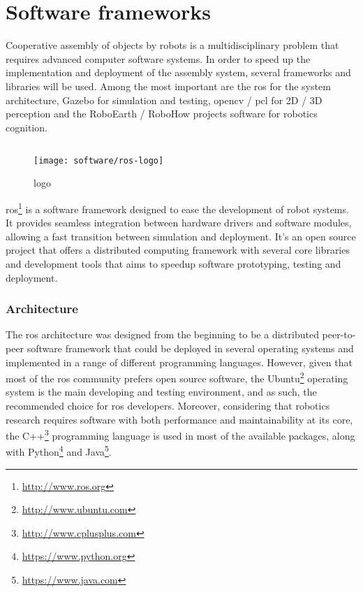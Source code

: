 \section{Software frameworks}

Cooperative assembly of objects by robots is a multidisciplinary problem that requires advanced computer software systems. In order to speed up the implementation and deployment of the assembly system, several frameworks and libraries will be used. Among the most important are the \gls{ros} for the system architecture, Gazebo for simulation and testing, \gls{opencv} / \gls{pcl} for 2D / 3D perception and the RoboEarth / RoboHow projects software for robotics cognition.

\subsection{}

\begin{wrapfigure}{r}{0.23\textwidth}
	\centering
	\vspace*{-2em}
	\texttt{[image: software/ros-logo]}
	\caption{ logo}
	\label{fig:ros-logo}
\end{wrapfigure}

\gls{ros}\footnote{\url{http://www.ros.org}} \cite{Quigley2009} is a software framework designed to ease the development of robot systems. It provides seamless integration between hardware drivers and software modules, allowing a fast transition between simulation and deployment. It's an open source project that offers a distributed computing framework with several core libraries and development tools that aims to speedup software prototyping, testing and deployment.


\subsubsection{Architecture}

The \gls{ros} architecture was designed from the beginning to be a distributed peer-to-peer software framework that could be deployed in several operating systems and implemented in a range of different programming languages. However, given that most of the \gls{ros} community prefers open source software, the Ubuntu\footnote{\url{http://www.ubuntu.com}} operating system is the main developing and testing environment, and as such, the recommended choice for \gls{ros} developers. Moreover, considering that robotics research requires software with both performance and maintainability at its core, the C++\footnote{\url{http://www.cplusplus.com}} programming language is used in most of the available packages, along with Python\footnote{\url{https://www.python.org}} and Java\footnote{\url{https://www.java.com}}.

